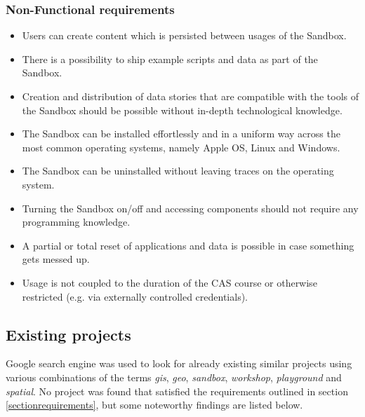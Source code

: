 \documentclass[11pt, a4paper, oneside, parskip=full-]{scrartcl}
\begin{document}
\subsubsection{Non-Functional requirements}
\begin{itemize}
  \item Users can create content which is persisted between usages of the
  Sandbox.
  \item There is a possibility to ship example scripts and data as part of the
  Sandbox.
  \item Creation and distribution of data stories that are compatible with the
  tools of the Sandbox should be possible without in-depth technological
  knowledge.
  \item The Sandbox can be installed effortlessly and in a uniform way across
  the most common operating systems, namely Apple OS, Linux and Windows.
  \item The Sandbox can be uninstalled without leaving traces on the operating
  system.
  \item Turning the Sandbox on/off and accessing components should not require
  any programming knowledge.
  \item A partial or total reset of applications and data is possible in case
  something gets messed up.
  \item Usage is not coupled to the duration of the CAS course or otherwise
  restricted (e.g. via externally controlled credentials).
\end{itemize}

\subsection{Existing projects}
Google search engine was used to look for already existing similar projects
using various combinations of the terms \emph{gis}, \emph{geo}, \emph{sandbox},
\emph{workshop}, \emph{playground} and \emph{spatial}. No project was found that
satisfied the requirements outlined in section \ref{sectionrequirements}, but
some noteworthy findings are listed below.
\end{document}
